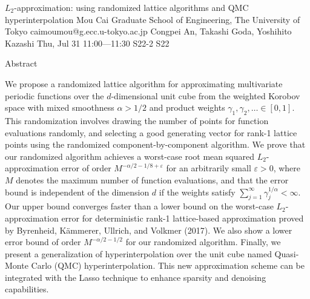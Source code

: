 \begin{talk}
  {$L_2$-approximation: using randomized lattice algorithms and QMC hyperinterpolation}%
  {Mou Cai}%
  {Graduate School of Engineering, The University of Tokyo}%
  {caimoumou@g.ecc.u-tokyo.ac.jp}%
  {Congpei An, Takashi Goda, Yoshihito Kazashi}%
  {}%
  {Thu, Jul 31 11:00---11:30}%
  {S22-2}%
  {S22}%
  
    
Abstract

   
We propose a randomized lattice algorithm for approximating multivariate periodic functions over the $d$-dimensional unit cube from the weighted Korobov space with mixed smoothness $\alpha > 1/2$ and product weights $\gamma_1,\gamma_2,\ldots\in [0,1]$. This randomization involves drawing the number of points for function evaluations randomly, and selecting a good generating vector for rank-1 lattice points using the randomized component-by-component algorithm. We prove that our randomized algorithm achieves a worst-case root mean squared $L_2$-approximation error of order $M^{-\alpha/2 - 1/8 + \varepsilon}$ for an arbitrarily small $\varepsilon > 0$, where $M$ denotes the maximum number of function evaluations, and that the error bound is independent of the dimension $d$ if the weights satisfy $\sum_{j=1}^\infty \gamma_j^{1/\alpha} < \infty$. Our upper bound converges faster than a lower bound on the worst-case $L_2$-approximation error for deterministic rank-1 lattice-based approximation proved by Byrenheid, K\"{a}mmerer, Ullrich, and Volkmer (2017). We also show a lower error bound of order $M^{-\alpha/2-1/2}$ for our randomized algorithm. Finally, we present a generalization of hyperinterpolation over the unit cube named Quasi-Monte Carlo (QMC) hyperinterpolation. This new approximation scheme can be integrated with the Lasso technique to enhance sparsity and denoising capabilities.

\medskip


\end{talk}

